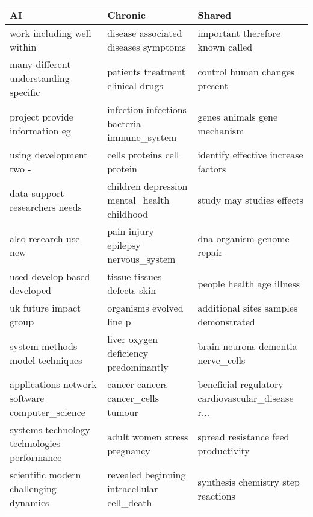 \begin{tabular}{lll}
\toprule
                                                AI &                                            Chronic &                                             Shared \\
\midrule
                        work including well within &               disease associated diseases symptoms &                   important therefore known called \\
             many different understanding specific &                  patients treatment clinical drugs &                      control human changes present \\
                    project provide information eg &        infection infections bacteria immune\_system &                       genes animals gene mechanism \\
                           using development two - &                        cells proteins cell protein &                identify effective increase factors \\
                    data support researchers needs &        children depression mental\_health childhood &                          study may studies effects \\
                             also research use new &                pain injury epilepsy nervous\_system &                         dna organism genome repair \\
                      used develop based developed &                        tissue tissues defects skin &                          people health age illness \\
                            uk future impact group &                           organisms evolved line p &              additional sites samples demonstrated \\
                   system methods model techniques &              liver oxygen deficiency predominantly &                 brain neurons dementia nerve\_cells \\
    applications network software computer\_science &                 cancer cancers cancer\_cells tumour &  beneficial regulatory cardiovascular\_disease r... \\
       systems technology technologies performance &                       adult women stress pregnancy &                spread resistance feed productivity \\
            scientific modern challenging dynamics &        revealed beginning intracellular cell\_death &                 synthesis chemistry step reactions \\

\end{tabular}
